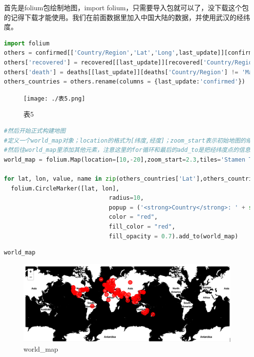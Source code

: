 \documentclass[UTF8,a4paper,12pt]{ctexart}  %
\begin{document}
首先是folium包绘制地图，import folium，只需要导入包就可以了，没下载这个包的记得下载才能使用。我们在前面数据里加入中国大陆的数据，并使用武汉的经纬度。

\begin{lstlisting}[language=Python]
import folium
others = confirmed[['Country/Region','Lat','Long',last_update]][confirmed['Country/Region'] != 'Mainland China']
others['recovered'] = recovered[[last_update]][recovered['Country/Region'] != 'Mainland China']
others['death'] = deaths[[last_update]][deaths['Country/Region'] != 'Mainland China']
others_countries = others.rename(columns = {last_update:'confirmed'})
\end{lstlisting}

\begin{figure}
\centering
\texttt{[image: ./表5.png]}
\caption{表5}
\end{figure}

\begin{lstlisting}[language=Python]
#然后开始正式构建地图
#定义一个world_map对象；location的格式为[纬度,经度]；zoom_start表示初始地图的缩放尺寸，数值越大放大程度越大；tiles为地图类型，用于控制绘图调用的地图样式，默认为'OpenStreetMap'，也有一些其他的内建地图样式，如'Stamen  Terrain'、'Stamen Toner'、'Mapbox Bright'、'Mapbox Control Room'等；也可以传入'None'来绘制一个没有风格的朴素地图，或传入一个URL来使用其它的自选osm。
#然后往world_map里添加其他元素，注意这里的for循环和最后的add_to是把经纬度点的信息一个一个的加进去
world_map = folium.Map(location=[10,-20],zoom_start=2.3,tiles='Stamen Toner')

for lat, lon, value, name in zip(others_countries['Lat'],others_countries['Long'],others_countries['confirmed'],others_countries['Country/Region']):
  folium.CircleMarker([lat, lon],
                              radius=10,
                              popup = ('<strong>Country</strong>: ' + str(name).capitalize()+'<br>' '<strong>Confirmed Cases</strong>: ' + str(value) + '<br>'),
                              color = "red",
                              fill_color = "red",
                              fill_opacity = 0.7).add_to(world_map)
\end{lstlisting}

\begin{lstlisting}[language=Python]
world_map
\end{lstlisting}

\begin{figure}
\centering
\includegraphics{./world_map.png}
\caption{world\_map}
\end{figure}
\end{document}
